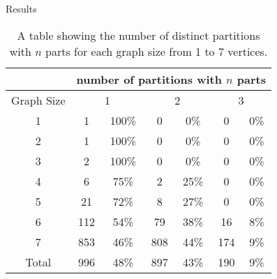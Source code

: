 \documentclass{beamer}
\begin{document}
\begin{frame}{Results}
	\begin{table}[h!]
		\centering
		\begin{tabular}{c|cccccc}
			& \multicolumn{6}{|c}{number of partitions with $n$ parts} \\
			\hline 
			Graph Size&\multicolumn{2}{|c}{1}&\multicolumn{2}{c}{2}&\multicolumn{2}{c}{3}\\
			\hline 
			1&1&100\%&0&0\%&0&0\%\\
			2&1&100\%&0&0\%&0&0\%\\
			3&2&100\%&0&0\%&0&0\%\\
			4&6&75\%&2&25\%&0&0\%\\
			5&21&72\%&8&27\%&0&0\%\\
			6&112&54\%&79&38\%&16&8\%\\
			7&853&46\%&808&44\%&174&9\%\\
			\hline
			Total& 996&48\%&897&43\%&190&9\%
		\end{tabular}
		\caption{A table showing the number of distinct partitions with $n$ parts for each graph size from 1 to 7 vertices. }
		\label{NumberClusters}
	\end{table}
\end{frame}
\end{document}
